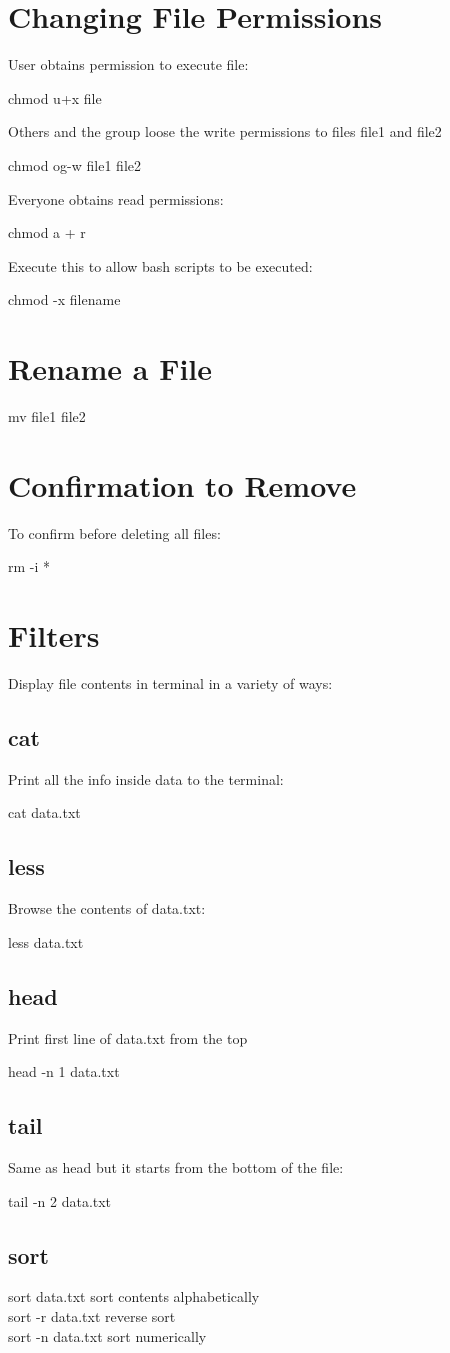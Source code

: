 \documentclass[10pt]{article}
\newcommand{\bt}{\begin{tcolorbox}}
\newcommand{\et}{\end{tcolorbox}}
\begin{document}
\section{Changing File Permissions}
User obtains permission to execute file:
  \bt
   chmod u+x file
  \et
\noindent Others and the group loose the write permissions to files file1 and file2
  \bt
   chmod og-w file1 file2
  \et
\noindent Everyone obtains read permissions:
  \bt
   chmod a + r
  \et
Execute this to allow bash scripts to be executed:
	\bt
	chmod -x filename
	\et
\section{Rename a File}

\bt
mv file1 file2
\et

\section{Confirmation to Remove}
To confirm before deleting all files:
\bt
rm -i *
\et

\section{Filters}
Display file contents in terminal in a variety of ways:
   \subsection{cat}
   Print all the info inside data to the terminal:
     \bt
     cat data.txt
     \et

  \subsection{less}
  Browse the contents of data.txt:
  \bt
  less data.txt
  \et

  \subsection{head}
  Print first line of data.txt from the top
  \bt
  head -n 1 data.txt
  \et

  \subsection{tail}
  Same as head but it starts from the bottom of the file:
  \bt
  tail -n 2 data.txt
  \et

  \subsection{sort}
  \bt
  sort data.txt \qquad sort contents alphabetically\\
  sort -r data.txt \quad reverse sort\\
  sort -n data.txt \quad sort numerically
  \et
  
\end{document}
